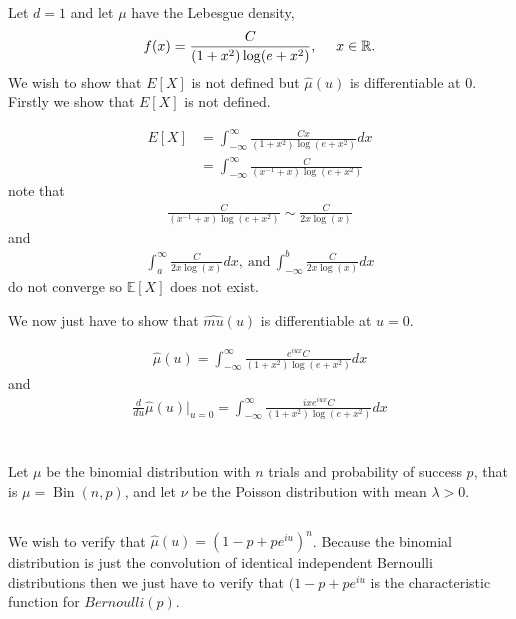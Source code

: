 \documentclass{unswmaths}
\begin{document}
\subsection{}
Let $ d = 1 $ and let $ \mu $ have the  Lebesgue density,
\begin{align}
	f(x) = \frac{C}{(1+x^2) \log(e + x^2)}, \ \ \ \ x \in \mathbb{R}.
\end{align}
We wish to show that $ E[X] $ is not defined but $ \hat{\mu}(u) $ is differentiable at $ 0 $. Firstly we show that $ E[X] $ is not defined. 

\begin{align}
	E[X] &= \int_{-\infty}^\infty \frac{Cx}{(1+x^2) \log(e + x^2)} dx \\
		&= \int_{-\infty}^\infty \frac{C}{(x^{-1} + x)\log(e + x^2)}
\end{align}
note that
\begin{align}
	\frac{C}{(x^{-1} + x)\log(e + x^2)} \sim \frac{C}{2x\log(x)}
\end{align}
and 
\begin{align}
	\int_{a}^\infty \frac{C}{2x\log(x)}dx, \ \text{and} \ \int_{-\infty}^b \frac{C}{2x\log(x)}dx
\end{align}
do not converge so $ \mathbb{E}[X] $ does not exist.

We now just have to show that $ \hat{mu}(u) $ is differentiable at $ u = 0 $. 

\begin{align}
	\hat{\mu}(u) = \int_{-\infty}^\infty \frac{e^{iux}C}{(1+x^2)\log(e+x^2)} dx
\end{align}
and
\begin{align}
	\frac{d}{du}\hat{\mu}(u) \Big|_{u = 0} = \int_{-\infty}^\infty \frac{ixe^{iux}C}{(1+x^2)\log(e+x^2)} dx
\end{align}

\section{}
Let $\mu$ be the binomial distribution with $ n $ trials and probability of success $ p $, that is $ \mu = \operatorname{Bin}(n,p) $, and let $ \nu $ be the Poisson distribution with mean $ \lambda > 0 $. 
\subsection{}
We wish to verify that $ \hat{\mu}(u) = (1 - p + pe^{iu})^n $. 
Because the binomial distribution is just the convolution of identical independent Bernoulli distributions then we just have to verify that $ (1 - p + pe^{iu} $ is the characteristic function for $Bernoulli(p)$.
\end{document}
